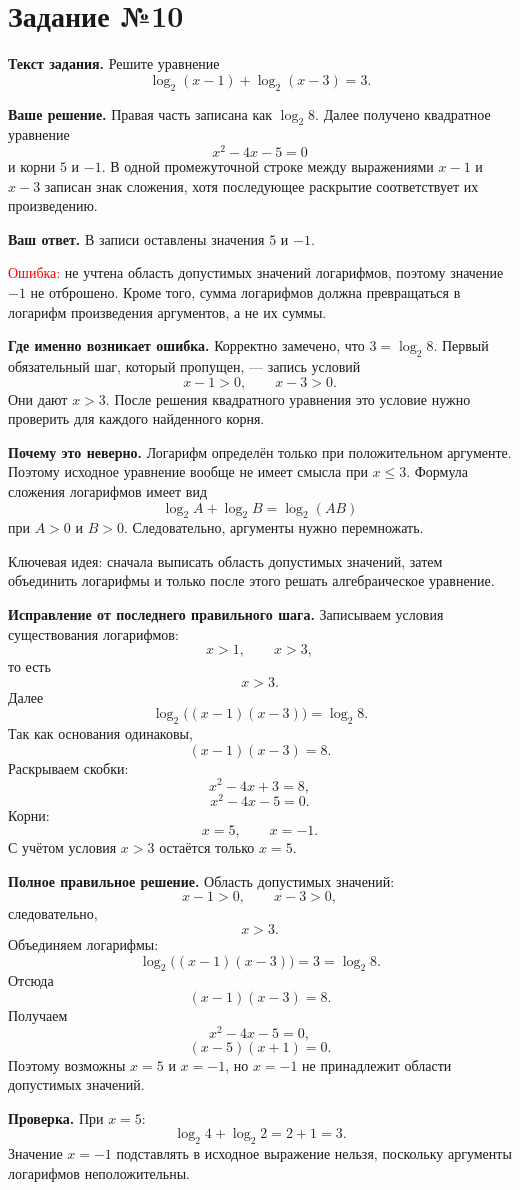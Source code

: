 \documentclass[12pt,a4paper]{article}
\newcommand{\err}{\textcolor{red}{Ошибка:}}
\newcommand{\idea}{\textcolor{blue!60!black}{Ключевая идея:}}
\newcommand{\tasktitle}[1]{\phantomsection\label{task:#1}\section*{Задание №#1}}
\begin{document}
\newpage
\tasktitle{10}
\textbf{Текст задания.} Решите уравнение
\[
\log_2(x-1)+\log_2(x-3)=3.
\]

\textbf{Ваше решение.} Правая часть записана как $\log_2 8$. Далее получено квадратное уравнение
\[
x^2-4x-5=0
\]
и корни $5$ и $-1$. В одной промежуточной строке между выражениями $x-1$ и $x-3$ записан знак сложения, хотя последующее раскрытие соответствует их произведению.

\textbf{Ваш ответ.} В записи оставлены значения $5$ и $-1$.

\err{} не учтена область допустимых значений логарифмов, поэтому значение $-1$ не отброшено. Кроме того, сумма логарифмов должна превращаться в логарифм произведения аргументов, а не их суммы.

\textbf{Где именно возникает ошибка.} Корректно замечено, что $3=\log_2 8$. Первый обязательный шаг, который пропущен, --- запись условий
\[
x-1>0,\qquad x-3>0.
\]
Они дают $x>3$. После решения квадратного уравнения это условие нужно проверить для каждого найденного корня.

\textbf{Почему это неверно.} Логарифм определён только при положительном аргументе. Поэтому исходное уравнение вообще не имеет смысла при $x\leq3$. Формула сложения логарифмов имеет вид
\[
\log_2 A+\log_2 B=\log_2(AB)
\]
при $A>0$ и $B>0$. Следовательно, аргументы нужно перемножать.

\idea{} сначала выписать область допустимых значений, затем объединить логарифмы и только после этого решать алгебраическое уравнение.

\textbf{Исправление от последнего правильного шага.} Записываем условия существования логарифмов:
\[
x>1,\qquad x>3,
\]
то есть
\[
x>3.
\]
Далее
\[
\log_2\bigl((x-1)(x-3)\bigr)=\log_2 8.
\]
Так как основания одинаковы,
\[
(x-1)(x-3)=8.
\]
Раскрываем скобки:
\[
x^2-4x+3=8,
\]
\[
x^2-4x-5=0.
\]
Корни:
\[
x=5,\qquad x=-1.
\]
С учётом условия $x>3$ остаётся только $x=5$.

\textbf{Полное правильное решение.} Область допустимых значений:
\[
x-1>0,\qquad x-3>0,
\]
следовательно,
\[
x>3.
\]
Объединяем логарифмы:
\[
\log_2\bigl((x-1)(x-3)\bigr)=3=\log_2 8.
\]
Отсюда
\[
(x-1)(x-3)=8.
\]
Получаем
\[
x^2-4x-5=0,
\]
\[
(x-5)(x+1)=0.
\]
Поэтому возможны $x=5$ и $x=-1$, но $x=-1$ не принадлежит области допустимых значений.

\textbf{Проверка.} При $x=5$:
\[
\log_2 4+\log_2 2=2+1=3.
\]
Значение $x=-1$ подставлять в исходное выражение нельзя, поскольку аргументы логарифмов неположительны.
\end{document}
